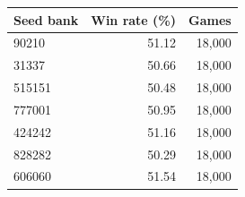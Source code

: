 \begin{tabular}{lrr}
\toprule
Seed bank & Win rate (\%) & Games \\
\midrule
90210 & 51.12 & 18,000 \\
31337 & 50.66 & 18,000 \\
515151 & 50.48 & 18,000 \\
777001 & 50.95 & 18,000 \\
424242 & 51.16 & 18,000 \\
828282 & 50.29 & 18,000 \\
606060 & 51.54 & 18,000 \\
\bottomrule
\end{tabular}
